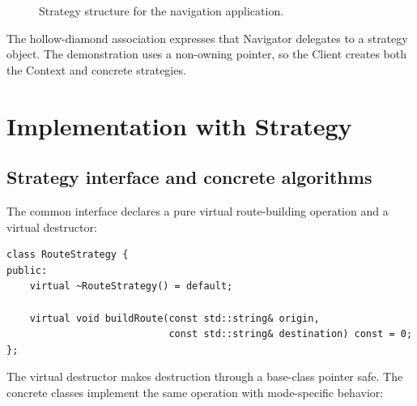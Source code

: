 \documentclass[11pt,a4paper]{report}
\begin{document}
\begin{figure}[H]
{%
  }
  \caption{Strategy structure for the navigation application.}\label{fig:strategy-navigation}
\end{figure}

The hollow-diamond association expresses that Navigator delegates to a strategy
object. The demonstration uses a non-owning pointer, so the Client creates both
the Context and concrete strategies.

\section{Implementation with Strategy}
\subsection{Strategy interface and concrete algorithms}
The common interface declares a pure virtual route-building operation and a
virtual destructor:

\begin{lstlisting}[style=cpp]
class RouteStrategy {
public:
    virtual ~RouteStrategy() = default;

    virtual void buildRoute(const std::string& origin,
                            const std::string& destination) const = 0;
};
\end{lstlisting}

The virtual destructor makes destruction through a base-class pointer safe. The
concrete classes implement the same operation with mode-specific behavior:
\end{document}
